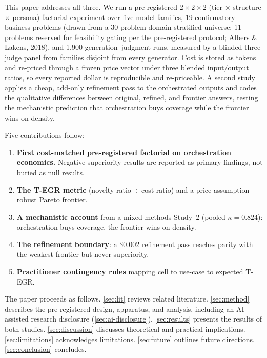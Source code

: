 \documentclass[12pt,a4paper]{article}
\begin{document}
This paper addresses all three. We run a pre-registered $2 \times 2 \times 2$
(tier $\times$ structure $\times$ persona) factorial experiment over five model
families, 19 confirmatory business problems (drawn from a 30-problem
domain-stratified universe; 11 problems reserved for feasibility gating
per the pre-registered protocol; Albers \& Lakens, 2018), and 1{,}900
generation--judgment runs, measured by a blinded three-judge panel from
families disjoint from every generator. Cost is stored as tokens and re-priced
through a frozen price vector under three blended input/output ratios, so every
reported dollar is reproducible and re-priceable. A second study applies a
cheap, add-only refinement pass to the orchestrated outputs and codes the
qualitative differences between original, refined, and frontier answers,
testing the mechanistic prediction that orchestration buys coverage while the
frontier wins on density.

Five contributions follow:
\begin{enumerate}[leftmargin=*,nosep]
  \item \textbf{First cost-matched pre-registered factorial on orchestration
        economics.} Negative superiority results are reported as primary
        findings, not buried as null results.
  \item \textbf{The T-EGR metric} (novelty ratio $\div$ cost ratio) and a
        price-assumption-robust Pareto frontier.
  \item \textbf{A mechanistic account} from a mixed-methods Study~2 (pooled
        $\kappa = 0.824$): orchestration buys coverage, the frontier wins on
        density.
  \item \textbf{The refinement boundary}: a \$0.002 refinement pass reaches
        parity with the weakest frontier but never superiority.
  \item \textbf{Practitioner contingency rules} mapping cell to use-case to
        expected T-EGR.
\end{enumerate}

The paper proceeds as follows. \cref{sec:lit} reviews related literature.
\cref{sec:method} describes the pre-registered design, apparatus, and analysis,
including an AI-assisted research disclosure (\cref{sec:ai-disclosure}).
\cref{sec:results} presents the results of both studies. \cref{sec:discussion}
discusses theoretical and practical implications. \cref{sec:limitations}
acknowledges limitations. \cref{sec:future} outlines future directions.
\cref{sec:conclusion} concludes.
\end{document}
